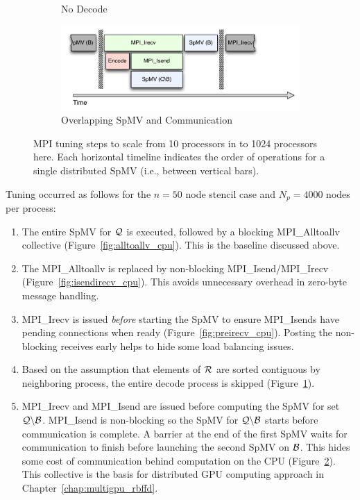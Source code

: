 \documentclass{report}
\begin{document}
\begin{figure}
\begin{subfigure}{0.48\textwidth}
\caption{No Decode}
\label{fig:no_decode_cpu}
\end{subfigure}
\begin{subfigure}{0.48\textwidth}
\centering
\includegraphics[width=\textwidth]{../figures/omnigraffle/OverlapCPU.pdf}
\caption{Overlapping SpMV and Communication}
\label{fig:overlap_cpu}
\end{subfigure}
\caption{MPI tuning steps to scale from 10 processors in \cite{BolligFlyerErlebacher2012} to 1024 processors here. Each horizontal timeline indicates the order of operations for a single distributed SpMV (i.e., between vertical bars). } 
\label{fig:mpi_tuning}
\end{figure}


Tuning occurred as follows for the $n=50$ node stencil case and $N_p=4000$ nodes per process:  
\begin{enumerate} 
\item The entire SpMV for $\mathcal{Q}$ is executed, followed by a blocking MPI\_Alltoallv collective (Figure~\ref{fig:alltoallv_cpu}). This is the baseline discussed above.
\item The MPI\_Alltoallv is replaced by non-blocking MPI\_Isend/MPI\_Irecv (Figure~\ref{fig:isendirecv_cpu}). This avoids unnecessary overhead in zero-byte message handling. 
\item MPI\_Irecv is issued \emph{before} starting the SpMV to ensure MPI\_Isends have pending connections when ready (Figure~\ref{fig:preirecv_cpu}). Posting the non-blocking receives early helps to hide some load balancing issues. 
\item Based on the assumption that elements of $\mathcal{R}$ are sorted contiguous by neighboring process, the entire decode process is skipped (Figure~\ref{fig:no_decode_cpu}). 
\item MPI\_Irecv and MPI\_Isend are issued before computing the SpMV for set $\mathcal{Q} \backslash \mathcal{B}$. MPI\_Isend is non-blocking so the SpMV for $\mathcal{Q} \backslash \mathcal{B}$ starts before communication is complete. A barrier at the end of the first SpMV waits for communication to finish before launching the second SpMV on $\mathcal{B}$. This hides some cost of communication behind computation on the CPU (Figure~\ref{fig:overlap_cpu}). This collective is the basis for distributed GPU computing approach in Chapter~\ref{chap:multigpu_rbffd}.
\end{enumerate}
\end{document}
